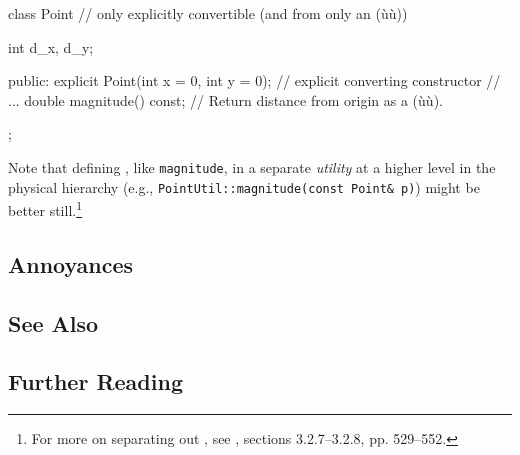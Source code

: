 \begin{emcppslisting}
class Point  // only explicitly convertible (and from only an (ù{}ù))
{
    int d_x, d_y;

public:
    explicit Point(int x = 0, int y = 0);  // explicit converting constructor
    // ...
    double magnitude() const;  // Return distance from origin as a (ù{}ù).
};
\end{emcppslisting}
    
\noindent Note that defining , like
\lstinline!magnitude!, in a separate \emph{utility} at a higher level in the
physical hierarchy (e.g., \lstinline!PointUtil::magnitude(const!~\lstinline!Point&!~\lstinline!p)!) might be better still.{\cprotect\footnote{For more on
separating out , see
  \cite{lakos20}, sections 3.2.7--3.2.8, pp. 529--552.}}

\subsection[Annoyances]{Annoyances}\label{annoyances}

\hspace{\fill}

\subsection[See Also]{See Also}\label{see-also}

\hspace{\fill}

\subsection[Further Reading]{Further Reading}\label{further-reading}

\hspace{\fill}

